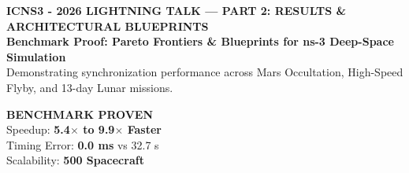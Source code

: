 \documentclass[9pt]{article}
\begin{document}
\begin{tcolorbox}[enhanced, colback=spaceNavy, colframe=electricCyan, boxrule=1.5pt, arc=5pt,
    left=9pt, right=9pt, top=5pt, bottom=5pt]
    \begin{minipage}[c]{0.75\textwidth}
        {\fontsize{7.5pt}{9pt}\selectfont \color{electricCyan}\textbf{ICNS3 - 2026 LIGHTNING TALK --- PART 2: RESULTS \& ARCHITECTURAL BLUEPRINTS}}\\[2pt]
        {\fontsize{12pt}{14pt}\selectfont \color{white}\textbf{Benchmark Proof: Pareto Frontiers \& Blueprints for ns-3 Deep-Space Simulation}}\\[2pt]
        {\fontsize{7.5pt}{9.5pt}\selectfont \color{gray!30}Demonstrating synchronization performance across Mars Occultation, High-Speed Flyby, and 13-day Lunar missions.}
    \end{minipage}%
    \hfill
    \begin{minipage}[c]{0.23\textwidth}
        \centering
        \begin{tcolorbox}[colback=pillBg, colframe=greenAccent, boxrule=0.8pt, arc=3pt, left=4pt, right=4pt, top=3pt, bottom=3pt]
            \centering
            {\fontsize{7pt}{8pt}\selectfont \color{greenAccent}\textbf{BENCHMARK PROVEN}}\\[1pt]
            {\fontsize{6.5pt}{7.5pt}\selectfont \color{white} Speedup: \textbf{5.4$\times$ to 9.9$\times$ Faster}}\\
            {\fontsize{6.5pt}{7.5pt}\selectfont \color{white} Timing Error: \textbf{0.0 ms} vs 32.7 s}\\
            {\fontsize{6.5pt}{7.5pt}\selectfont \color{pillCyan} Scalability: \textbf{500 Spacecraft}}
        \end{tcolorbox}
    \end{minipage}
\end{tcolorbox}

\vspace{0.1cm}
\end{document}
